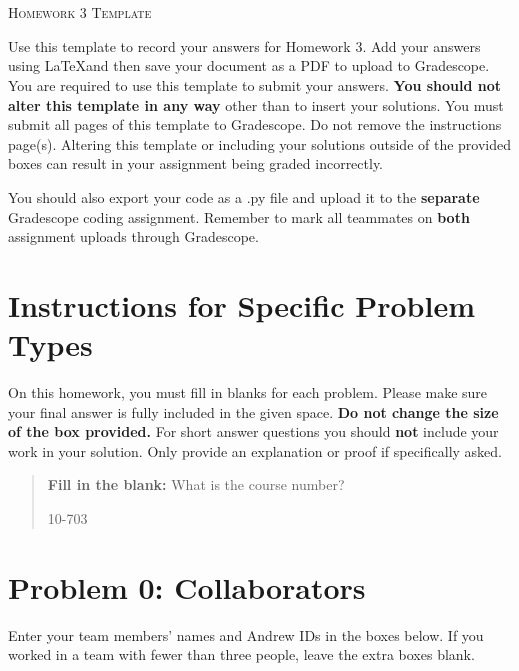 \documentclass[12pt]{article}
\begin{document}
\section*{}
\begin{center}
  \centerline{\textsc{\LARGE  Homework 3 Template}}
\end{center}

Use this template to record your answers for Homework 3.  Add your answers using \LaTeX and then save your document as a PDF to upload to Gradescope.  You are required to use this template to submit your answers.  \textbf{You should not alter this template in any way} other than to insert your solutions.  You must submit all \pageref{LastPage} pages of this template to Gradescope.  Do not remove the instructions page(s).  Altering this template or including your solutions outside of the provided boxes can result in your assignment being graded incorrectly.

You should also export your code as a .py file and upload it to the \textbf{separate} Gradescope coding assignment. Remember to mark all teammates on \textbf{both} assignment uploads through Gradescope.

\section*{Instructions for Specific Problem Types}

On this homework, you must fill in blanks for each problem. Please make sure your final answer is fully included in the given space.  \textbf{Do not change the size of the box provided.}  For short answer questions you should \textbf{not} include your work in your solution.  Only provide an explanation or proof if specifically asked.

\begin{quote}
\textbf{Fill in the blank:} What is the course number?

\begin{tcolorbox}[fit,height=1cm, width=4cm, blank, borderline={1pt}{-2pt},nobeforeafter]
    \begin{center}\huge10-703\end{center}
    \end{tcolorbox}
\end{quote}

\newpage

\section*{Problem 0: Collaborators}
Enter your team members' names and Andrew IDs in the boxes below. If you worked in a team with fewer than three people, leave the extra boxes blank.
\end{document}
